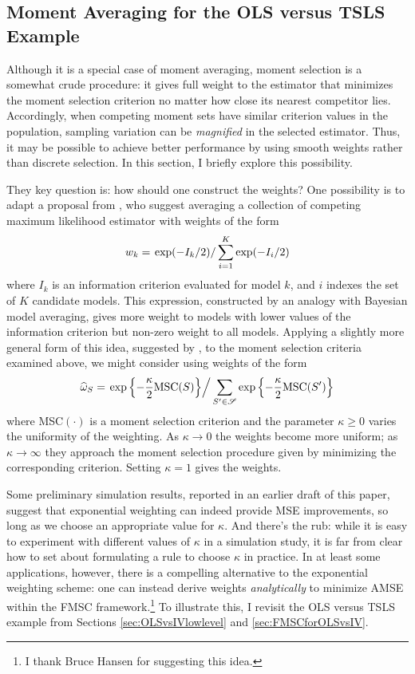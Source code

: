 \subsection{Moment Averaging for the OLS versus TSLS Example}
\label{sec:momentavgexample}
Although it is a special case of moment averaging, moment selection is a somewhat crude procedure: it gives full weight to the estimator that minimizes the moment selection criterion no matter how close its nearest competitor lies. 
Accordingly, when competing moment sets have similar criterion values in the population, sampling variation can be \emph{magnified} in the selected estimator. 
Thus, it may be possible to achieve better performance by using smooth weights rather than discrete selection.
In this section, I briefly explore this possibility.

They key question is: how should one construct the weights?
One possibility is to adapt a proposal from \cite{Burnhametal}, who suggest averaging a collection of competing maximum likelihood estimator with weights of the form 
\[w_k =\left. \exp(-I_k/2)\right/\sum_{i=1}^K \exp(-I_i/2)\] 
where $I_k$ is an information criterion evaluated for model $k$, and $i$ indexes the set of $K$ candidate models. 
This expression, constructed by an analogy with Bayesian model averaging, gives more weight to models with lower values of the information criterion but non-zero weight to all models. 
Applying a slightly more general form of this idea, suggested by \cite{ClaeskensHjortbook}, to the moment selection criteria examined above, we might consider using weights of the form	
\[		\widehat{\omega}_S = \left.\exp\left\{-\frac{\kappa}{2} \mbox{MSC}(S)\right\}\right/\sum_{S' \in \mathscr{S}}\exp\left\{-\frac{\kappa}{2} \mbox{MSC}(S')\right\}\]
where MSC$(\cdot)$ is a moment selection criterion and the parameter $\kappa \geq 0$ varies the uniformity of the weighting. 
As $\kappa \rightarrow 0$ the weights become more uniform; as $\kappa \rightarrow \infty$ they approach the moment selection procedure given by minimizing the corresponding criterion. 
Setting $\kappa = 1$ gives the \cite{Burnhametal} weights.

Some preliminary simulation results, reported in an earlier draft of this paper, suggest that exponential weighting can indeed provide MSE improvements, so long as we choose an appropriate value for $\kappa$.
And there's the rub: while it is easy to experiment with different values of $\kappa$ in a simulation study, it is far from clear how to set about formulating a rule to choose $\kappa$ in practice. In at least some applications, however, there is a compelling alternative to the exponential weighting scheme: one can instead derive weights \emph{analytically} to minimize AMSE within the FMSC framework.\footnote{I thank Bruce Hansen for suggesting this idea.} 
To illustrate this, I revisit the OLS versus TSLS example from Sections \ref{sec:OLSvsIVlowlevel} and \ref{sec:FMSCforOLSvsIV}. 

